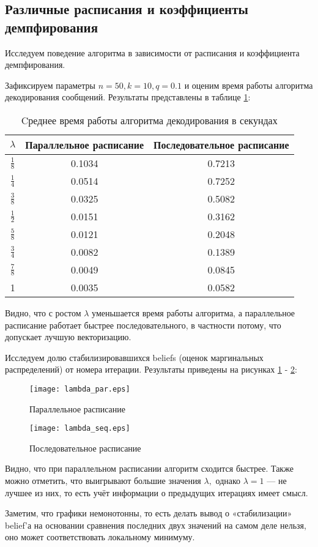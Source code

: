 \documentclass[12pt,a4paper,oneside,fleqn,leqno]{article}
\begin{document}
		\subsection{Различные расписания и коэффициенты демпфирования}
			Исследуем поведение алгоритма в зависимости от расписания и коэффициента демпфирования.\par
			Зафиксируем параметры $n = 50, k = 10, q = 0.1$ и оценим время работы алгоритма декодирования сообщений. Результаты представлены в таблице \ref{tab:lambda}:
			\begin{table}[H]
				\centering
				\begin{tabular}{|c|c|c|}
					\hline
					$\lambda$  & Параллельное расписание & Последовательное расписание\\
					\hline
					$\frac{1}{8}$ & 0.1034 & 0.7213\\
					\hline
					$\frac{1}{4}$ & 0.0514& 0.7252\\
					\hline
					$\frac{3}{8}$ & 0.0325& 0.5082\\
					\hline
					$\frac{1}{2}$ & 0.0151& 0.3162\\
					\hline
					$\frac{5}{8}$ & 0.0121& 0.2048\\
					\hline
					$\frac{3}{4}$ & 0.0082& 0.1389\\
					\hline
					$\frac{7}{8}$ & 0.0049& 0.0845\\
					\hline
					1 & 0.0035& 0.0582\\
					\hline
				\end{tabular}
				\captionsetup{justification=centering}				
				\caption{Cреднее время работы алгоритма декодирования в секундах}
				\label{tab:lambda}
			\end{table}\par
			Видно, что с ростом $\lambda$ уменьшается время работы алгоритма, а параллельное расписание работает быстрее последовательного, в частности потому, что допускает лучшую векторизацию.\par
			Исследуем долю стабилизировавшихся beliefs (оценок маргинальных распределений) от номера итерации. Результаты приведены на рисунках \ref{fig:lambda_par} - \ref{fig:lambda_seq}:
			\begin{figure}[H]
				\centering
				\captionsetup{justification=centering}
				\texttt{[image: lambda\_par.eps]}
				\caption{Параллельное расписание}
				\label{fig:lambda_par}
			\end{figure}
			\begin{figure}[H]
				\centering
				\captionsetup{justification=centering}
				\texttt{[image: lambda\_seq.eps]}
				\caption{Последовательное расписание}
				\label{fig:lambda_seq}
			\end{figure}\par
			Видно, что при параллельном расписании алгоритм сходится быстрее. Также можно отметить, что выигрывают большие значения $\lambda,$ однако $\lambda = 1$ --- не лучшее из них, то есть учёт информации о предыдущих итерациях имеет смысл.\par
			Заметим, что графики немонотонны, то есть делать вывод о «стабилизации» belief'а на основании сравнения последних двух значений на самом деле нельзя, оно может соответствовать локальному минимуму.
\end{document}
